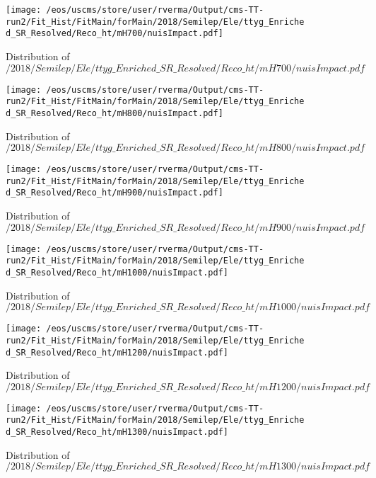 \begin{figure}
\centering
\texttt{[image: /eos/uscms/store/user/rverma/Output/cms-TT-run2/Fit\_Hist/FitMain/forMain/2018/Semilep/Ele/ttyg\_Enriched\_SR\_Resolved/Reco\_ht/mH700/nuisImpact.pdf]}
\caption{Distribution of $/2018/Semilep/Ele/ttyg\_Enriched\_SR\_Resolved/Reco\_ht/mH700/nuisImpact.pdf$}
\end{figure}

\begin{figure}
\centering
\texttt{[image: /eos/uscms/store/user/rverma/Output/cms-TT-run2/Fit\_Hist/FitMain/forMain/2018/Semilep/Ele/ttyg\_Enriched\_SR\_Resolved/Reco\_ht/mH800/nuisImpact.pdf]}
\caption{Distribution of $/2018/Semilep/Ele/ttyg\_Enriched\_SR\_Resolved/Reco\_ht/mH800/nuisImpact.pdf$}
\end{figure}

\begin{figure}
\centering
\texttt{[image: /eos/uscms/store/user/rverma/Output/cms-TT-run2/Fit\_Hist/FitMain/forMain/2018/Semilep/Ele/ttyg\_Enriched\_SR\_Resolved/Reco\_ht/mH900/nuisImpact.pdf]}
\caption{Distribution of $/2018/Semilep/Ele/ttyg\_Enriched\_SR\_Resolved/Reco\_ht/mH900/nuisImpact.pdf$}
\end{figure}

\begin{figure}
\centering
\texttt{[image: /eos/uscms/store/user/rverma/Output/cms-TT-run2/Fit\_Hist/FitMain/forMain/2018/Semilep/Ele/ttyg\_Enriched\_SR\_Resolved/Reco\_ht/mH1000/nuisImpact.pdf]}
\caption{Distribution of $/2018/Semilep/Ele/ttyg\_Enriched\_SR\_Resolved/Reco\_ht/mH1000/nuisImpact.pdf$}
\end{figure}

\begin{figure}
\centering
\texttt{[image: /eos/uscms/store/user/rverma/Output/cms-TT-run2/Fit\_Hist/FitMain/forMain/2018/Semilep/Ele/ttyg\_Enriched\_SR\_Resolved/Reco\_ht/mH1200/nuisImpact.pdf]}
\caption{Distribution of $/2018/Semilep/Ele/ttyg\_Enriched\_SR\_Resolved/Reco\_ht/mH1200/nuisImpact.pdf$}
\end{figure}

\begin{figure}
\centering
\texttt{[image: /eos/uscms/store/user/rverma/Output/cms-TT-run2/Fit\_Hist/FitMain/forMain/2018/Semilep/Ele/ttyg\_Enriched\_SR\_Resolved/Reco\_ht/mH1300/nuisImpact.pdf]}
\caption{Distribution of $/2018/Semilep/Ele/ttyg\_Enriched\_SR\_Resolved/Reco\_ht/mH1300/nuisImpact.pdf$}
\end{figure}

